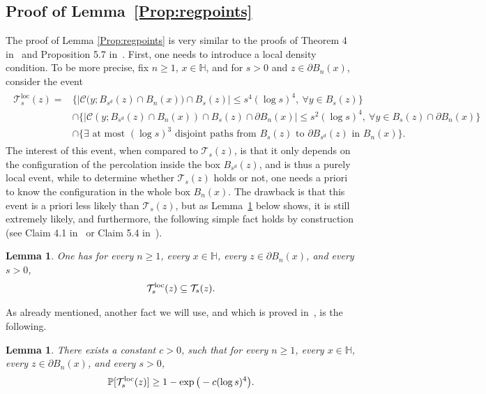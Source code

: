 \documentclass[11pt,a4paper]{article}
\numberwithin{equation}{section}
\theoremstyle{plain}
\newtheorem{Lem}[Thm]{Lemma}
\theoremstyle{definition}
\begin{document}
\subsection{Proof of Lemma~\ref{Prop:regpoints}}
\label{sec:proofPropreg}
The proof of Lemma \ref{Prop:regpoints} is very similar to the proofs of Theorem 4 in~\cite{KozmaNachmias} and Proposition 5.7 in~\cite{Asselah2025capacity}.  
First, one needs to introduce a local density condition. To be more precise, fix $n\ge 1$, $x\in \mathbb H$, and for $s>0$ and $z\in \partial B_n(x)$, consider the event 
\begin{align}
\begin{split}
\mathcal T_s^{\textrm{loc}}(z) =& \Big\{|\mathcal C\big(y; B_{s^d}(z)\cap B_n(x)\big)\cap B_s(z)|\leq s^4 (\log s)^4,\ \forall y \in B_s(z)\Big\} \\
				&\cap  \Big\{|\mathcal C(y;B_{s^d}(z)\cap B_n(x)) \cap B_s(z)\cap \partial B_n(x) |\leq s^2 (\log s)^4, \ \forall y\in B_s(z)\cap \partial B_n(x) \Big\} \\ 
				&\cap \Big\{ \exists  \text{ at most }  (\log s)^3 \text{ disjoint paths from }B_s(z) \text{ to } \partial B_{s^d}(z)\text{ in } B_n(x) \Big\}.	
				\end{split}		
\end{align}
The interest of this event, when compared to $\mathcal T_s(z)$, is that it only depends on the configuration of the percolation inside the box $B_{s^d}(z)$, and is thus a purely local event, while to determine whether $\mathcal T_s(z)$ holds or not, one needs a priori to know the configuration in the whole box $B_n(x)$. The drawback is that this event is a priori less likely than $\mathcal T_s(z)$, but as Lemma~\ref{lem:Tsloc} below shows, it is still extremely likely, and furthermore, the following simple fact holds by construction (see Claim 4.1 in~\cite{KozmaNachmias} or Claim 5.4 in~\cite{Asselah2025capacity}). 
\begin{Lem}\label{lem:Tsloc.Ts}
One has for every $n\ge 1$, every $x\in \mathbb H$, every $z\in \partial B_n(x)$, and every $s>0$, 
\begin{equation}
\mathcal T_s^{\textup{loc}}(z) \subseteq \mathcal T_s(z).
\end{equation} 
\end{Lem} 
As already mentioned, another fact we will use, and which is proved in~\cite[Claim~5.5]{Asselah2025capacity}, is the following. 
\begin{Lem}\label{lem:Tsloc}
There exists a constant $c>0$, such that for every $n\ge 1$, every $x\in \mathbb H$, every $z\in \partial B_n(x)$, and every $s>0$, 
\begin{equation}
\mathbb P[\mathcal T_s^{\textup{loc}}(z)] \ge 1 - \exp\big(-c(\log s)^4\big).
\end{equation}
\end{Lem} 
\end{document}
